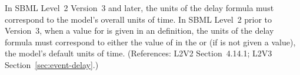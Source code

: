 In SBML Level~2 Version~3 and later, the units of the \Event delay formula
must correspond to the model's overall units of time.  In SBML Level~2
prior to Version~3, when a value for  is given in an \Event
definition, the units of the delay formula must correspond to either the
value of  in the \Event or (if  is not
given a value), the model's default units of time.  (References: L2V2
Section~4.14.1; L2V3 Section~\ref{sec:event-delay}.)
